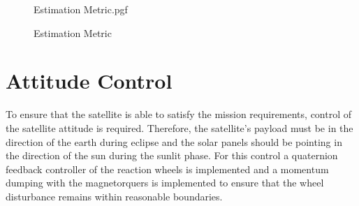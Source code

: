 \begin{figure}[!htb]
	\centering
	\def\pgfwidth{10cm}
	{Estimation Metric.pgf}
	
	\caption{Estimation Metric}
	\label{fig:Estimation Metric}
\end{figure}


\section{Attitude Control}
To ensure that the satellite is able to satisfy the mission requirements, control of the satellite attitude is required. Therefore, the satellite's payload must be in the direction of the earth during eclipse and the solar panels should be pointing in the direction of the sun during the sunlit phase. For this control a quaternion feedback controller of the reaction wheels is implemented and a momentum dumping with the magnetorquers is implemented to ensure that the wheel disturbance remains within reasonable boundaries.

